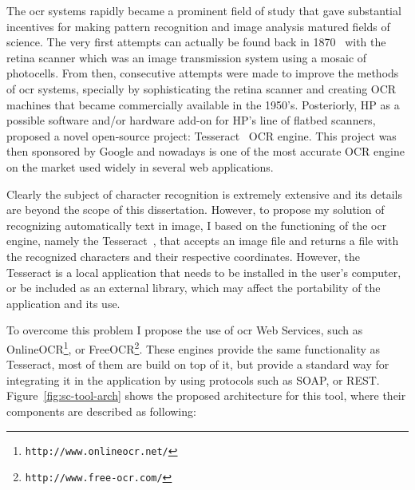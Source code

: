 The \gls{ocr} systems rapidly became a prominent field of study that gave substantial incentives for making pattern recognition and image analysis matured fields of science. The very first attempts can actually be found back in 1870~\citep{eikvil1993optical} with the retina scanner which was an image transmission system using a mosaic of photocells. From then, consecutive attempts were made to improve the methods of \gls{ocr} systems, specially by sophisticating the retina scanner and creating OCR machines that became commercially available in the 1950's. Posteriorly, HP as a possible software and/or hardware add-on for HP's line of flatbed scanners, proposed a novel open-source project: Tesseract~\citep{smith2007overview} OCR engine. This project was then sponsored by Google and nowadays is one of the most accurate OCR engine on the market used widely in several web applications.

Clearly the subject of character recognition is extremely extensive and its details are beyond the scope of this dissertation. However, to propose my solution of recognizing automatically text in image, I based on the functioning of the \gls{ocr} engine, namely the Tesseract~\citep{smith2007overview}, that accepts an image file and returns a file with the recognized characters and their respective coordinates. However, the Tesseract is a local application that needs to be installed in the user's computer, or be included as an external library, which may affect the portability of the application and its use.

To overcome this problem I propose the use of \gls{ocr} Web Services, such as OnlineOCR\footnote{\texttt{http://www.onlineocr.net/}}, or FreeOCR\footnote{\texttt{http://www.free-ocr.com/}}. These engines provide the same functionality as Tesseract, most of them are build on top of it, but provide a standard way for integrating it in the application by using protocols such as SOAP, or REST. Figure~\ref{fig:sc-tool-arch} shows the proposed architecture for this tool, where their components are described as following:

